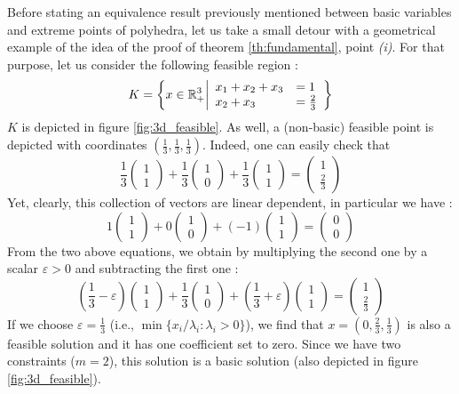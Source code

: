 Before stating an equivalence result previously mentioned between basic variables and extreme points of polyhedra, let us take a small detour with a geometrical example of the idea of the proof of theorem \ref{th:fundamental}, point \textit{(i)}. For that purpose, let us consider the following feasible region : \[ K = \left\{ x\in\mathbb R^3_+ \middle| \begin{array}{ll} x_1 + x_2 + x_3 &= 1 \\ x_2 + x_3 &= \frac 23 \end{array} \right\} \] $K$ is depicted in figure \ref{fig:3d_feasible}. As well, a (non-basic) feasible point is depicted with coordinates $(\frac 13, \frac 13, \frac 13)$. Indeed, one can easily check that \[ \frac 13 \begin{pmatrix} 1\\ 1 \end{pmatrix} + \frac 13 \begin{pmatrix} 1\\ 0 \end{pmatrix} + \frac 13 \begin{pmatrix} 1\\1 \end{pmatrix} = \begin{pmatrix} 1\\\frac 23 \end{pmatrix} \] Yet, clearly, this collection of vectors are linear dependent, in particular we have : \[ 1 \begin{pmatrix} 1\\ 1 \end{pmatrix} + 0 \begin{pmatrix} 1\\ 0 \end{pmatrix} + (-1) \begin{pmatrix} 1\\1 \end{pmatrix} = \begin{pmatrix} 0\\ 0 \end{pmatrix} \] From the two above equations, we obtain by multiplying the second one by a scalar $\varepsilon>0$ and subtracting the first one : \[ \left(\frac 13 - \varepsilon\right) \begin{pmatrix} 1\\ 1 \end{pmatrix} + \frac 13 \begin{pmatrix} 1\\ 0 \end{pmatrix} + \left(\frac 13 + \varepsilon\right) \begin{pmatrix} 1\\1 \end{pmatrix} = \begin{pmatrix} 1\\\frac 23 \end{pmatrix} \] If we choose $\varepsilon = \frac 13$ (i.e., $\min\{ x_i/\lambda_i : \lambda_i > 0 \}$), we find that $x = (0,\frac 23, \frac 13)$ is also a feasible solution and it has one coefficient set to zero. Since we have two constraints ($m=2$), this solution is a basic solution (also depicted in figure \ref{fig:3d_feasible}).

